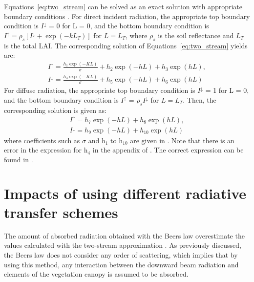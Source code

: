 Equations~\ref{eq:two_stream} can be solved as an exact solution with appropriate boundary conditions \citep{Sellers1985}. For direct incident radiation, the appropriate top boundary condition is $I^{\downarrow}$ = 0 for L = 0, and the bottom boundary condition is $I^{\uparrow} = \rho_s[I^{\downarrow} + \exp{(-kL_T)}]$ for $L = L_T$, where $\rho_s$ is the soil reflectance and $L_T$ is the total LAI. The corresponding solution of Equations~\ref{eq:two_stream} yields \citep{Sellers1985} are:
\begin{equation}
\begin{gathered}
I^{\uparrow} = \frac{h_1\exp{(-KL)}}{\sigma} + h_2\exp{(-hL)} + h_3\exp{(hL)},\\
I^{\downarrow} = \frac{h_4\exp{(-KL)}}{\sigma} + h_5\exp{(-hL)} + h_6\exp{(hL)}
\end{gathered}
\end{equation}\label{eq:two_stream_dir}
For diffuse radiation, the appropriate top boundary condition is $I^{\downarrow}$ = 1 for L = 0, and the bottom boundary condition is $I^{\uparrow}$ = $\rho_sI^{\downarrow}$ for $L = L_T$. Then, the corresponding solution is given as:
\begin{equation}
\begin{gathered}
I^{\uparrow} = h_7\exp{(-hL)} + h_8\exp{(hL)},\\
I^{\downarrow} = h_9\exp{(-hL)} + h_{10}\exp{(hL)}
\end{gathered}
\end{equation}\label{eq:two_stream_dif}
\noindent where coefficients such as $\sigma$ and h$_1$ to h$_{10}$ are given in \citet{Sellers1985}. Note that there is an error in the expression for h$_4$ in the appendix of \citet{Sellers1985}. The correct expression can be found in \citet{Sellers1996}. %

\section{Impacts of using different radiative transfer schemes}

The amount of absorbed radiation obtained with the Beer\textquotesingle s law overestimate the values calculated with the two-stream approximation \citep{Wang2003}. As previously discussed, the Beer\textquotesingle s law does not consider any order of scattering, which implies that by using this method, any interaction between the downward beam radiation and elements of the vegetation canopy is assumed to be absorbed. 

